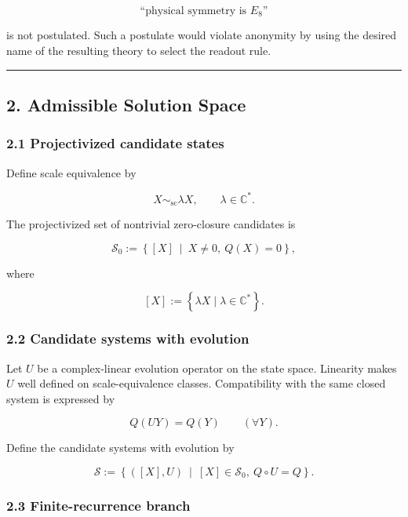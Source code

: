 \documentclass[
  a4paper,
]{article}
\begin{document}
\[
\text{“physical symmetry is }E_8\text{”}
\]

is not postulated. Such a postulate would violate anonymity by using the
desired name of the resulting theory to select the readout rule.

\begin{center}\rule{0.5\linewidth}{0.5pt}\end{center}

\subsection{2. Admissible Solution
Space}\label{admissible-solution-space}

\subsubsection{2.1 Projectivized candidate
states}\label{projectivized-candidate-states}

Define scale equivalence by

\[
X\sim_{\mathrm{sc}}\lambda X,
\qquad
\lambda\in\mathbb C^\ast.
\]

The projectivized set of nontrivial zero-closure candidates is

\[
\mathscr S_0
:=
\left\{
[X]
\ \middle|\
X\neq0,\ Q(X)=0
\right\},
\]

where

\[
[X]
:=
\left\{
\lambda X
\mid
\lambda\in\mathbb C^\ast
\right\}.
\]

\subsubsection{2.2 Candidate systems with
evolution}\label{candidate-systems-with-evolution}

Let \(U\) be a complex-linear evolution operator on the state space.
Linearity makes \(U\) well defined on scale-equivalence classes.
Compatibility with the same closed system is expressed by

\[
Q(UY)=Q(Y)
\qquad
(\forall Y).
\]

Define the candidate systems with evolution by

\[
\mathscr S
:=
\left\{
([X],U)
\ \middle|\
[X]\in\mathscr S_0,\ Q\circ U=Q
\right\}.
\]

\subsubsection{2.3 Finite-recurrence
branch}\label{finite-recurrence-branch}
\end{document}
